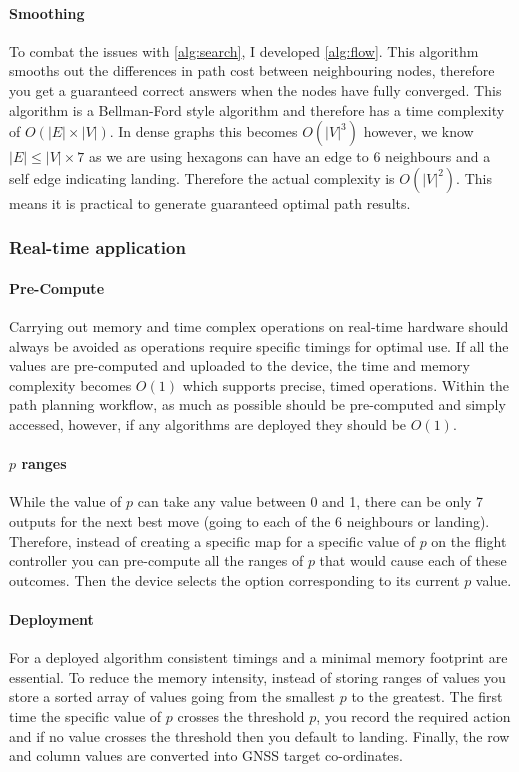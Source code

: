 \paragraph{Smoothing}
To combat the issues with \ref{alg:search}, I developed \ref{alg:flow}. This algorithm smooths out the differences in path cost between neighbouring nodes, therefore you get a guaranteed correct answers when the nodes have fully converged. This algorithm is a Bellman-Ford style algorithm and therefore has a time complexity of $O(|E|\times |V|)$. In dense graphs this becomes  $O(|V|^3)$ however, we know $|E| \leq |V| \times 7$ as we are using hexagons can have an edge to 6 neighbours and a self edge indicating landing. Therefore the actual complexity is $O(|V|^2)$. This means it is practical to generate guaranteed optimal path results.

\subsubsection{Real-time application}
\paragraph{Pre-Compute}
Carrying out memory and time complex operations on real-time hardware should always be avoided as operations require specific timings for optimal use. If all the values are pre-computed and uploaded to the device, the time and memory complexity becomes $O(1)$ which supports precise, timed operations. Within the path planning workflow, as much as possible should be pre-computed and simply accessed, however, if any algorithms are deployed they should be $O(1)$.
\paragraph{$p$ ranges}
While the value of $p$ can take any value between 0 and 1, there can be only 7 outputs for the next best move (going to each of the 6 neighbours or landing). Therefore, instead of creating a specific map for a specific value of $p$ on the flight controller you can pre-compute all the ranges of $p$ that would cause each of these outcomes. Then the device selects the option corresponding to its current $p$ value.
\paragraph{Deployment}
For a deployed algorithm consistent timings and a minimal memory footprint are essential. To reduce the memory intensity, instead of storing ranges of values you store a sorted array of values going from the smallest $p$ to the greatest. The first time the specific value of $p$ crosses the threshold $p$, you record the required action and if no value crosses the threshold then you default to landing. Finally, the row and column values are converted into \gls{GNSS} target co-ordinates.
